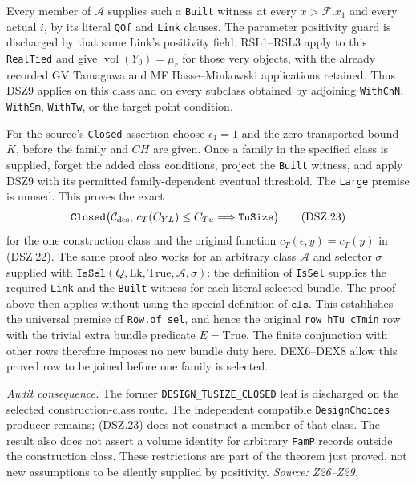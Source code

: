 Every member of $\mathcal A$ supplies such a \texttt{Built}
witness at every $x>\mathcal F.x_1$ and every actual $i$, by its
literal \texttt{QOf} and \texttt{Link} clauses. The parameter
positivity guard is discharged by that same Link's positivity
field. RSL1--RSL3 apply to this \texttt{RealTied} and give
$\operatorname{vol}(Y_0)=\mu_r$ for those very objects, with
the already recorded GV Tamagawa and MF Hasse--Minkowski
applications retained. Thus DSZ9 applies on this class and on
every subclass obtained by adjoining \texttt{WithChN},
\texttt{WithSm}, \texttt{WithTw}, or the target point condition.

For the source's \texttt{Closed} assertion choose
$\epsilon_1=1$ and the zero transported bound $K$, before the
family and $CH$ are given. Once a family in the specified class
is supplied, forget the added class conditions, project the
\texttt{Built} witness, and apply DSZ9 with its permitted
family-dependent eventual threshold. The \texttt{Large}
premise is unused. This proves the exact
\[
 \texttt{Closed}\bigl(\mathcal C_{\rm des},\,
       c_T(C_{YL})\le C_{Tu}\Longrightarrow\texttt{TuSize}\bigr)
                                                               \tag{DSZ.23}
\]
for the one construction class and the original function
$c_T(\epsilon,y)=c_T(y)$ in (DSZ.22).
The same proof also works for an arbitrary class $\mathcal A$ and
selector $\sigma$ supplied with
$\texttt{IsSel}(Q,\mathrm{Lk},\mathrm{True},\mathcal A,\sigma)$:
the definition of \texttt{IsSel} supplies the required \texttt{Link}
and the \texttt{Built} witness for each literal selected bundle.
The proof above then applies without using the special definition
of $\texttt{cls}$. This establishes the universal premise of
\texttt{Row.of\_sel}, and hence the original
\texttt{row\_hTu\_cTmin} row with the trivial extra bundle predicate
$E=\mathrm{True}$.
The finite conjunction with other rows therefore imposes no new
bundle duty here. DEX6--DEX8 allow this proved row to be joined
before one family is selected.

\emph{Audit consequence.} The former \texttt{DESIGN\_TUSIZE\_CLOSED}
leaf is discharged on the selected construction-class route.
The independent compatible \texttt{DesignChoices} producer remains;
(DSZ.23) does not construct a member of that class. The result also
does not assert a volume identity for arbitrary \texttt{FamP}
records outside the construction class. These restrictions are
part of the theorem just proved, not new assumptions to be
silently supplied by positivity.
\emph{Source: Z26--Z29.}
